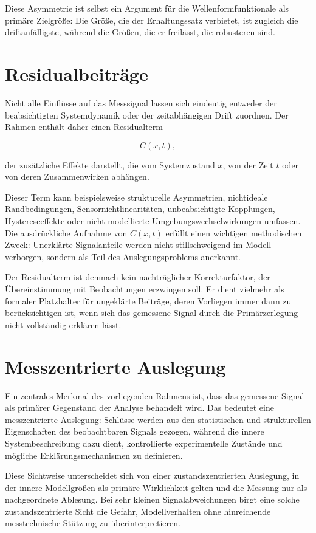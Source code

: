 \documentclass[12pt,a4paper]{report}
\begin{document}
Diese Asymmetrie ist selbst ein Argument für die Wellenformfunktionale
als primäre Zielgröße: Die Größe, die der Erhaltungssatz verbietet, ist
zugleich die driftanfälligste, während die Größen, die er freilässt, die
robusteren sind.

\section{Residualbeiträge}

Nicht alle Einflüsse auf das Messsignal lassen sich eindeutig entweder
der beabsichtigten Systemdynamik oder der zeitabhängigen Drift zuordnen.
Der Rahmen enthält daher einen Residualterm

\begin{equation}
C(x,t),
\end{equation}

der zusätzliche Effekte darstellt, die vom Systemzustand $x$, von der
Zeit $t$ oder von deren Zusammenwirken abhängen.

Dieser Term kann beispielsweise strukturelle Asymmetrien, nichtideale
Randbedingungen, Sensornichtlinearitäten, unbeabsichtigte Kopplungen,
Hystereseeffekte oder nicht modellierte Umgebungswechselwirkungen
umfassen. Die ausdrückliche Aufnahme von $C(x,t)$ erfüllt einen wichtigen
methodischen Zweck: Unerklärte Signalanteile werden nicht stillschweigend
im Modell verborgen, sondern als Teil des Auslegungsproblems anerkannt.

Der Residualterm ist demnach kein nachträglicher Korrekturfaktor, der
Übereinstimmung mit Beobachtungen erzwingen soll. Er dient vielmehr als
formaler Platzhalter für ungeklärte Beiträge, deren Vorliegen immer dann
zu berücksichtigen ist, wenn sich das gemessene Signal durch die
Primärzerlegung nicht vollständig erklären lässt.

\section{Messzentrierte Auslegung}

Ein zentrales Merkmal des vorliegenden Rahmens ist, dass das gemessene
Signal als primärer Gegenstand der Analyse behandelt wird. Das bedeutet
eine messzentrierte Auslegung: Schlüsse werden aus den statistischen und
strukturellen Eigenschaften des beobachtbaren Signals gezogen, während
die innere Systembeschreibung dazu dient, kontrollierte experimentelle
Zustände und mögliche Erklärungsmechanismen zu definieren.

Diese Sichtweise unterscheidet sich von einer zustandszentrierten
Auslegung, in der innere Modellgrößen als primäre Wirklichkeit gelten und
die Messung nur als nachgeordnete Ablesung. Bei sehr kleinen
Signalabweichungen birgt eine solche zustandszentrierte Sicht die Gefahr,
Modellverhalten ohne hinreichende messtechnische Stützung zu
überinterpretieren.
\end{document}
